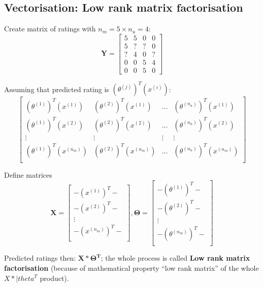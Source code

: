 \documentclass{scrartcl}
\begin{document}
\subsection{Vectorisation: Low rank matrix factorisation}
\label{sec:16-5}

Create matrix of ratings with $n_m = 5 \times n_u=4$:
\[ \mathbf{Y} = \left[ 
\begin{array}{cccc}
  5 & 5 & 0 & 0 \\
  5 & ? & ? & 0 \\
  ? & 4 & 0 & ? \\
  0 & 0 & 5 & 4 \\
  0 & 0 & 5 & 0
\end{array} \right]\]

Assuming that predicted rating is $(\theta^{(j)})^T(x^{(i)})$: \[ 
\left[
  \begin{array}{cccc}
   (\theta^{(1)})^T(x^{(1)}) &  (\theta^{(2)})^T(x^{(1)}) & \dots &
   (\theta^{(n_u)})^T(x^{(1)}) \\
   (\theta^{(1)})^T(x^{(2)}) &  (\theta^{(2)})^T(x^{(2)}) & \dots &
   (\theta^{(n_u)})^T(x^{(2)}) \\
\vdots & \vdots & \vdots & \vdots \\
   (\theta^{(1)})^T(x^{(n_m)}) &  (\theta^{(2)})^T(x^{(n_m)}) & \dots &
   (\theta^{(n_u)})^T(x^{(n_m)}) \\
  \end{array}
\right]
\]

Define matrices \[\mathbf{X} = \left[
  \begin{array}{c}
    - (x^{(1)})^T - \\
    - (x^{(2)})^T - \\
    \vdots \\
    - (x^{(n_m)})^T - \\
  \end{array}
\right], \mathbf{\Theta} = \left[
  \begin{array}{c}
    - (\theta^{(1)})^T - \\
    - (\theta^{(2)})^T - \\
    \vdots \\
    - (\theta^{(n_m)})^T - \\
  \end{array}
\right]\]

Predicted ratings then: $\mathbf{X * \Theta^T}$; the whole process is
called {\bf Low rank matrix factorisation} (because of mathematical
property ``low rank matrix'' of the whole $X * |theta^T$ product).
\end{document}
